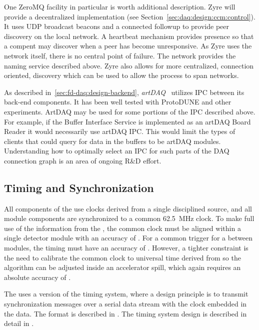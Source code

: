 One ZeroMQ facility in particular is worth additional description. 
Zyre will provide a decentralized implementation  (see Section~\ref{sec:daq:design:ccm:control}). 
It uses UDP broadcast beacons and a connected followup to provide peer discovery on the local network. 
A heartbeat mechanism provides presence so that a compent may discover when a peer has become unresponsive.  
As Zyre uses the network itself, there is no central point of failure. 
The network provides the naming service described above. 
Zyre also allows for more centralized, connection oriented, discovery which can be used to allow the process to span networks.

As described in~\ref{sec:fd-daq:design-backend}, \textit{artDAQ}~\cite{artdaq} utilizes IPC between its back-end components. 
It has been well tested with ProtoDUNE and other experiments. 
ArtDAQ may be used for some portions of the IPC described above. 
For example, if the Buffer Interface Service is implemented as an artDAQ Board Reader it would necessarily use artDAQ IPC. 
This would limit the types of clients that could query for data in the buffers to be artDAQ modules. 
Understanding how to optimally select an IPC for such parts of the DAQ connection graph is an area of ongoing R\&D effort.

\subsection{Timing and Synchronization}
\label{sec:sp-daq:design-timing}

All components of the  use clocks derived from a single
 disciplined source, and all module components are
synchronized to a common \SI{62.5}{MHz} clock. 
To make full use of the information from the , the common clock must be aligned within a single detector %
module with an accuracy of . 
For a common trigger for a  between modules, the timing must have an accuracy of .
However, a tighter constraint is the need to calibrate the common clock to universal time derived from  so the  algorithm can be adjusted inside an accelerator spill, which again requires an absolute accuracy of .

The   uses a version of the  timing
system, where a design principle is to transmit synchronization messages over
a serial data stream with the clock embedded in the data. The format
is described in . The timing system design is
described in detail in .

